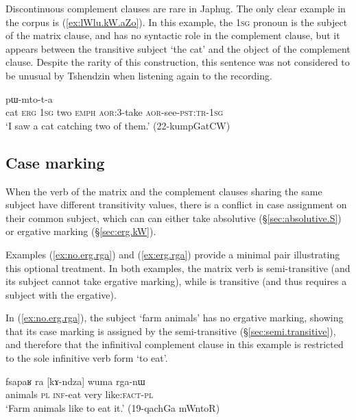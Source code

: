 Discontinuous complement clauses are rare in Japhug. The only clear example in the corpus is (\ref{ex:lWlu.kW.aZo}). In this example, the \textsc{1sg} pronoun  is the subject of the matrix clause, and has no syntactic role in the complement clause, but it appears between the transitive subject  `the cat' and the object  of the complement clause. Despite the rarity of this construction, this sentence was not considered to be unusual by Tshendzin when listening again to the recording.
 
 \begin{exe}
\ex \label{ex:lWlu.kW.aZo}
 pɯ-mto-t-a \\
cat \textsc{erg} \textsc{1sg} two \textsc{emph} \textsc{aor}:3\flobv{}-take \textsc{aor}-see-\textsc{pst}:\textsc{tr}-\textsc{1sg} \\
\glt `I saw a cat catching two of them.' (22-kumpGatCW)
\end{exe}

\subsection{Case marking} \label{sec:complement.clause.case.marking}
When the verb of the matrix and the complement clauses sharing the same subject have different transitivity values, there is a conflict in case assignment on their common subject, which can can either take absolutive (§\ref{sec:absolutive.S}) or ergative marking (§\ref{sec:erg.kW}). 

Examples (\ref{ex:no.erg.rga}) and  (\ref{ex:erg.rga})  provide a minimal pair illustrating this optional treatment. In both examples, the matrix verb  is semi-transitive (and its subject cannot take ergative marking), while  is transitive (and thus requires a subject with the ergative).

In (\ref{ex:no.erg.rga}), the subject  `farm animals' has no ergative marking, showing that its case marking is assigned by the semi-transitive  (§\ref{sec:semi.transitive}), and therefore that the infinitival complement clause in this example is restricted to the sole infinitive verb form  `to eat'.

\begin{exe}
\ex \label{ex:no.erg.rga}
\gll fsapaʁ ra [kɤ-ndza] wuma rga-nɯ  \\
animals \textsc{pl}  \textsc{inf}-eat very  like:\textsc{fact}-\textsc{pl} \\
\glt `Farm animals like to eat it.' (19-qachGa mWntoR)
\end{exe}


